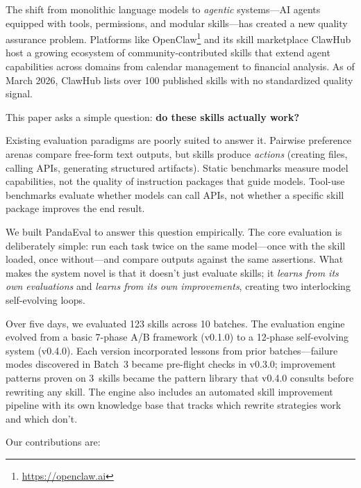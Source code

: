 \documentclass[11pt,a4paper]{article}
\begin{document}
The shift from monolithic language models to \emph{agentic} systems---AI agents equipped with tools, permissions, and modular skills---has created a new quality assurance problem. Platforms like OpenClaw\footnote{\url{https://openclaw.ai}} and its skill marketplace ClawHub host a growing ecosystem of community-contributed skills that extend agent capabilities across domains from calendar management to financial analysis. As of March 2026, ClawHub lists over 100 published skills with no standardized quality signal.

This paper asks a simple question: \textbf{do these skills actually work?}

Existing evaluation paradigms are poorly suited to answer it. Pairwise preference arenas \citep{chiang2024chatbot} compare free-form text outputs, but skills produce \emph{actions} (creating files, calling APIs, generating structured artifacts). Static benchmarks \citep{hendrycks2021mmlu, chen2021humaneval} measure model capabilities, not the quality of instruction packages that guide models. Tool-use benchmarks \citep{qin2023toolllm, li2023apibank} evaluate whether models can call APIs, not whether a specific skill package improves the end result.

We built PandaEval to answer this question empirically. The core evaluation is deliberately simple: run each task twice on the same model---once with the skill loaded, once without---and compare outputs against the same assertions. What makes the system novel is that it doesn't just evaluate skills; it \emph{learns from its own evaluations} and \emph{learns from its own improvements}, creating two interlocking self-evolving loops.

Over five days, we evaluated 123 skills across 10 batches. The evaluation engine evolved from a basic 7-phase A/B framework (v0.1.0) to a 12-phase self-evolving system (v0.4.0). Each version incorporated lessons from prior batches---failure modes discovered in Batch~3 became pre-flight checks in v0.3.0; improvement patterns proven on 3~skills became the pattern library that v0.4.0 consults before rewriting any skill. The engine also includes an automated skill improvement pipeline with its own knowledge base that tracks which rewrite strategies work and which don't.

Our contributions are:
\end{document}
